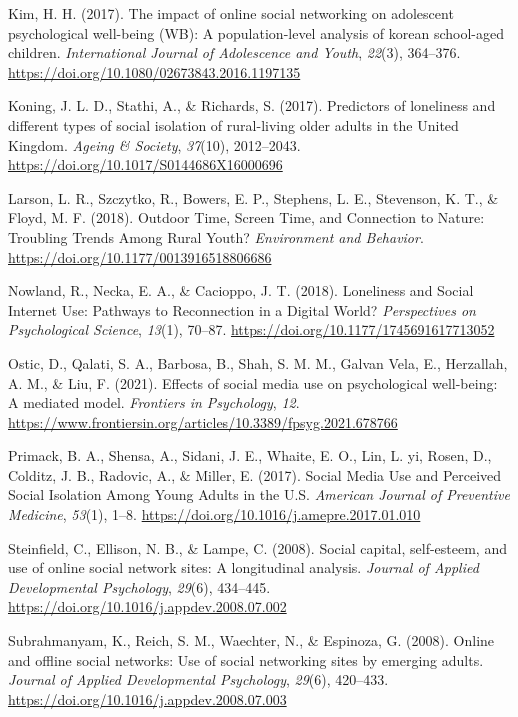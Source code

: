 \documentclass[]{interact}
\theoremstyle{plain}%
\theoremstyle{definition}
\theoremstyle{remark}
\newlength{\cslhangindent}
\newenvironment{CSLReferences}[2] %
 {\begin{list}{}{%
  \setlength{\itemindent}{0pt}
  \setlength{\leftmargin}{0pt}
  \setlength{\parsep}{0pt}
  \ifodd #1
   \setlength{\leftmargin}{\cslhangindent}
   \setlength{\itemindent}{-1\cslhangindent}
  \fi
  \setlength{\itemsep}{#2\baselineskip}}}
 {\end{list}}
\begin{document}
\begin{CSLReferences}{1}{0}
Kim, H. H. (2017). The impact of online social networking on adolescent
psychological well-being (WB): A population-level analysis of korean
school-aged children. \emph{International Journal of Adolescence and
Youth}, \emph{22}(3), 364--376.
\url{https://doi.org/10.1080/02673843.2016.1197135}

Koning, J. L. D., Stathi, A., \& Richards, S. (2017). Predictors of
loneliness and different types of social isolation of rural-living older
adults in the United Kingdom. \emph{Ageing \& Society}, \emph{37}(10),
2012--2043. \url{https://doi.org/10.1017/S0144686X16000696}

Larson, L. R., Szczytko, R., Bowers, E. P., Stephens, L. E., Stevenson,
K. T., \& Floyd, M. F. (2018). Outdoor Time, Screen Time, and Connection
to Nature: Troubling Trends Among Rural Youth? \emph{Environment and
Behavior}. \url{https://doi.org/10.1177/0013916518806686}

Nowland, R., Necka, E. A., \& Cacioppo, J. T. (2018). Loneliness and
Social Internet Use: Pathways to Reconnection in a Digital World?
\emph{Perspectives on Psychological Science}, \emph{13}(1), 70--87.
\url{https://doi.org/10.1177/1745691617713052}

Ostic, D., Qalati, S. A., Barbosa, B., Shah, S. M. M., Galvan Vela, E.,
Herzallah, A. M., \& Liu, F. (2021). Effects of social media use on
psychological well-being: A mediated model. \emph{Frontiers in
Psychology}, \emph{12}.
\url{https://www.frontiersin.org/articles/10.3389/fpsyg.2021.678766}

Primack, B. A., Shensa, A., Sidani, J. E., Whaite, E. O., Lin, L. yi,
Rosen, D., Colditz, J. B., Radovic, A., \& Miller, E. (2017). Social
Media Use and Perceived Social Isolation Among Young Adults in the U.S.
\emph{American Journal of Preventive Medicine}, \emph{53}(1), 1--8.
\url{https://doi.org/10.1016/j.amepre.2017.01.010}

Steinfield, C., Ellison, N. B., \& Lampe, C. (2008). Social capital,
self-esteem, and use of online social network sites: A longitudinal
analysis. \emph{Journal of Applied Developmental Psychology},
\emph{29}(6), 434--445.
\url{https://doi.org/10.1016/j.appdev.2008.07.002}

Subrahmanyam, K., Reich, S. M., Waechter, N., \& Espinoza, G. (2008).
Online and offline social networks: Use of social networking sites by
emerging adults. \emph{Journal of Applied Developmental Psychology},
\emph{29}(6), 420--433.
\url{https://doi.org/10.1016/j.appdev.2008.07.003}


\end{CSLReferences}
\end{document}
